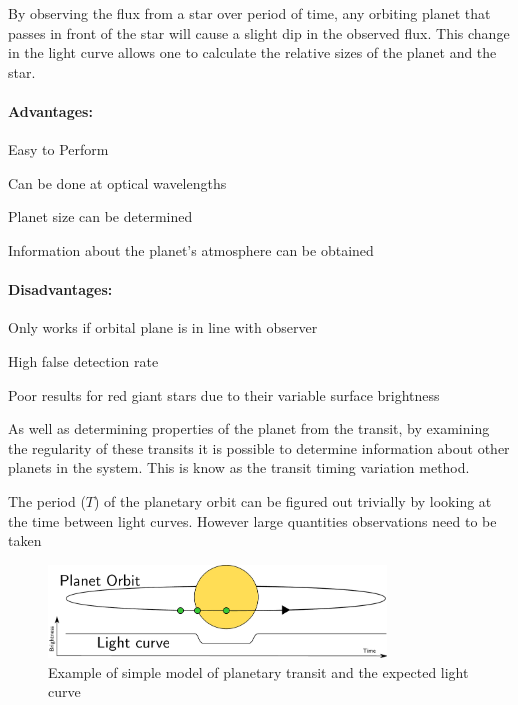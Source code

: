 By observing the flux from a star over period of time, any orbiting planet that passes in front of the star will cause a slight dip in the observed flux. This change in the light curve allows one to calculate the relative sizes of the planet and the star.

\paragraph{Advantages:}
\begin{itemize*}
    \item Easy to Perform
    \item Can be done at optical wavelengths
    \item Planet size can be determined
    \item Information about the planet's atmosphere can be obtained \citep{fortney2006atmosphere}
\end{itemize*}

\paragraph{Disadvantages:}
\begin{itemize*}
    \item Only works if orbital plane is in line with observer
    \item High false detection rate \citep{santerne2012sophie}
    \item Poor results for red giant stars due to their variable surface brightness
\end{itemize*}

As well as determining properties of the planet from the transit, by examining the regularity of these transits it is possible to determine information about other planets in the system. This is know as the transit timing variation method.

The period ($T$) of the planetary orbit can be figured out trivially by looking at the time between light curves. However large quantities observations need to be taken

\begin{figure}[ht]
    \centering
    \includegraphics[width=0.8\textwidth]{images/planetary_transit.pdf}
    \caption{Example of simple model of planetary transit and the expected light curve}
    \label{fig:transit}
\end{figure}

